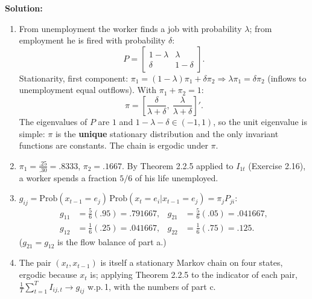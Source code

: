 \documentclass[12pt, letterpaper]{article}
\begin{document}
\begin{tcolorbox}[oddbox,title={Exercise 2.17 \quad Lake Model}]
\textbf{Solution:}

\begin{enumerate}
\item From unemployment the worker finds a job with probability $\lambda$; from employment he is
fired with probability $\delta$:
\[
P=\begin{bmatrix}1-\lambda&\lambda\\ \delta&1-\delta\end{bmatrix}.
\]
Stationarity, first component: $\pi_1=(1-\lambda)\pi_1+\delta\pi_2\Rightarrow\lambda\pi_1=\delta\pi_2$
(inflows to unemployment equal outflows). With $\pi_1+\pi_2=1$:
\[
\boxed{\pi=\left[\frac{\delta}{\lambda+\delta},\ \frac{\lambda}{\lambda+\delta}\right]'}.
\]
The eigenvalues of $P$ are $1$ and $1-\lambda-\delta\in(-1,1)$, so the unit eigenvalue is simple:
$\pi$ is the \textbf{unique} stationary distribution and the only invariant functions are constants.
The chain is ergodic under $\pi$.

\item $\pi_1=\frac{.25}{.30}=\boxed{.8333}$, $\pi_2=\boxed{.1667}$. By Theorem 2.2.5 applied to
$I_{1t}$ (Exercise 2.16), a worker spends a fraction $\boxed{5/6}$ of his life unemployed.

\item $g_{ij}=\text{Prob}(x_{t-1}=e_j)\,\text{Prob}(x_t=e_i|x_{t-1}=e_j)=\pi_jP_{ji}$:
\[
\begin{aligned}
g_{11}&=\tfrac56(.95)=.791667, & g_{21}&=\tfrac56(.05)=.041667,\\
g_{12}&=\tfrac16(.25)=.041667, & g_{22}&=\tfrac16(.75)=.125 .
\end{aligned}
\]
($g_{21}=g_{12}$ is the flow balance of part a.)
\item The pair $(x_t,x_{t-1})$ is itself a stationary Markov chain on four states, ergodic because
$x_t$ is; applying Theorem 2.2.5 to the indicator of each pair,
$\frac1T\sum_{t=1}^TI_{ij,t}\to g_{ij}$ w.p.\,1, with the numbers of part c.


\end{enumerate}
\end{tcolorbox}
\end{document}
